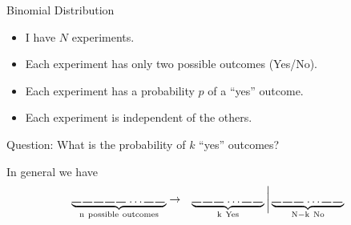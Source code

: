 \begin{frame}{Binomial Distribution}

  \begin{itemize}
  \item I have $N$ experiments.
  \item Each experiment has only two possible outcomes (Yes/No).
  \item Each experiment has a probability $p$ of a ``yes'' outcome.
  \item Each experiment is independent of the others.
  \end{itemize}

  \vfill

  Question: What is the probability of $k$ ``yes'' outcomes?

  \vfill

  In general we have 
  \begin{eqnarray*}
    \underbrace{
      \rule{.3cm}{.2mm} \hspace{.05cm} 
      \rule{.3cm}{.2mm} \hspace{.05cm} 
      \rule{.3cm}{.2mm} \hspace{.05cm} 
      \rule{.3cm}{.2mm} \hspace{.05cm} 
      \rule{.3cm}{.2mm} \hspace{.05cm} \ldots
      \rule{.3cm}{.2mm} \hspace{.05cm} 
      \rule{.3cm}{.2mm} \hspace{.05cm}}_{\mathrm{n~possible~outcomes}}
    & \rightarrow & 
    \underbrace{
      \rule{.3cm}{.2mm} \hspace{.05cm} 
      \rule{.3cm}{.2mm} \hspace{.05cm} 
      \rule{.3cm}{.2mm} \hspace{.05cm} \ldots
      \rule{.3cm}{.2mm} \hspace{.05cm} 
      \rule{.3cm}{.2mm} \hspace{.05cm}}_{\mathrm{k~Yes}}
    \bigg|
    \underbrace{
      \rule{.3cm}{.2mm} \hspace{.05cm} 
      \rule{.3cm}{.2mm} \hspace{.05cm} 
      \rule{.3cm}{.2mm} \hspace{.05cm} \ldots
      \rule{.3cm}{.2mm} \hspace{.05cm} 
      \rule{.3cm}{.2mm} \hspace{.05cm}}_{\mathrm{N-k~No}}
  \end{eqnarray*}



  
\end{frame}

